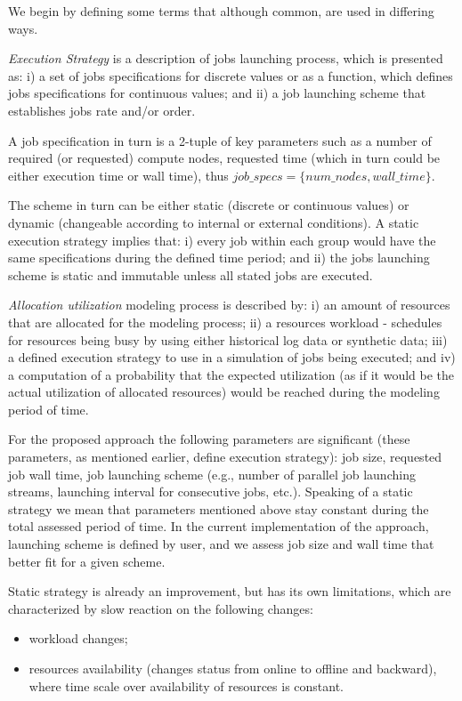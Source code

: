 We begin by defining some terms that although common, are used in differing
ways. 

\textit{Execution Strategy} is a description of jobs launching process, which
is presented as:
i) a set of jobs specifications for discrete values or as a function, which
defines jobs specifications for continuous values;
and ii) a job launching scheme that establishes jobs rate and/or order.

A job specification in turn is a 2-tuple of key parameters such as a number of
required (or requested) compute nodes, requested time (which in turn could be
either execution time or wall time), thus $job\_specs = \{num\_nodes,
wall\_time\}$.

The scheme in turn can be either static (discrete or continuous values) or
dynamic (changeable according to internal or external conditions).
A static execution strategy implies that:
i) every job within each group would have the same specifications during the
defined time period;
and ii) the jobs launching scheme is static and immutable unless all stated
jobs are executed.

\textit{Allocation utilization} modeling process is described by:
i) an amount of resources that are allocated for the modeling process;
ii) a resources workload - schedules for resources being busy by using either
historical log data or synthetic data;
iii) a defined execution strategy to use in a simulation of jobs being executed;
and iv) a computation of a probability that the expected utilization (as if it
would be the actual utilization of allocated resources) would be reached during
the modeling period of time.

For the proposed approach the following parameters are significant (these
parameters, as mentioned earlier, define execution strategy): job size,
requested job wall time, job launching scheme (e.g., number of parallel job
launching streams, launching interval for consecutive jobs, etc.).
Speaking of a static strategy we mean that parameters mentioned above stay
constant during the total assessed period of time.
In the current implementation of the approach, launching scheme is defined by
user, and we assess job size and wall time that better fit for a given scheme.

Static strategy is already an improvement, but has its own limitations,
which are characterized by slow reaction on the following changes:
\begin{itemize}
    \item workload changes;
    \item resources availability (changes status from online to offline and
    backward), where time scale over availability of resources is constant.
\end{itemize}

